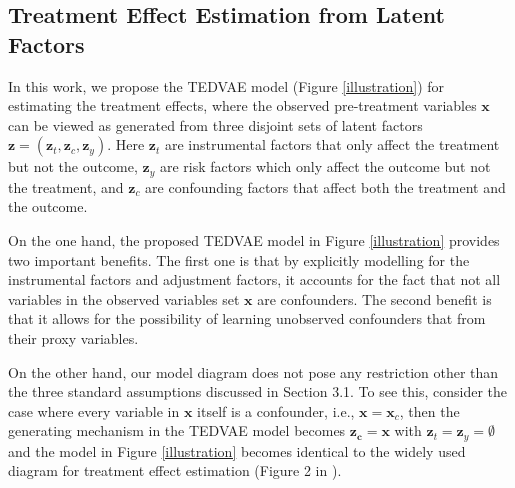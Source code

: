 \documentclass[letterpaper]{article} %
\begin{document}

\subsection*{Treatment Effect Estimation from Latent Factors}
%	
%	
%	


In this work, we propose the TEDVAE model (Figure \ref{illustration}) for estimating the treatment effects, where the observed pre-treatment variables $\mathbf{x}$ can be viewed as generated from three disjoint sets of latent factors $\mathbf{z} = (\mathbf{z}_t,\mathbf{z}_c, \mathbf{z}_y)$. 
Here $\mathbf{z}_t$ are instrumental factors that only affect the treatment but not the outcome, 
$\mathbf{z}_y$ are risk factors which only affect the outcome but not the treatment, 
and $\mathbf{z}_c$ are confounding factors that affect both the treatment and the outcome. 

On the one hand, the proposed TEDVAE model in Figure \ref{illustration} provides two important benefits. The first one is that by explicitly modelling for the instrumental factors and adjustment factors, it accounts for the fact that not all variables in the observed variables set $\mathbf{x}$ are confounders. The second benefit is that it allows for the possibility of learning unobserved confounders that from their proxy variables.

On the other hand, our model diagram does not pose any restriction other than the three standard assumptions discussed in Section 3.1. 
To see this, consider the case where every variable in $\mathbf{x}$ itself is a confounder, i.e., $\mathbf{x}=\mathbf{x}_c$, then the generating mechanism in the TEDVAE model becomes $\mathbf{z_c} = \mathbf{x}$ with $\mathbf{z}_t=\mathbf{z}_y=\emptyset$ and the model in Figure \ref{illustration} becomes identical to the widely used diagram for treatment effect estimation (Figure 2 in \cite{Imbens2019}).
\end{document}
